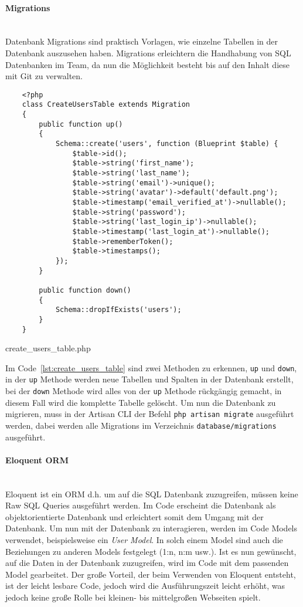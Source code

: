 \paragraph{Migrations}\mbox{}\\
Datenbank Migrations sind praktisch Vorlagen, wie einzelne Tabellen in der
Datenbank auszusehen haben. Migrations erleichtern die Handhabung von SQL
Datenbanken im Team, da nun die Möglichkeit besteht bis auf den Inhalt diese mit Git zu verwalten.

\begin{listing}[H]
  \begin{verbatim}
    <?php
    class CreateUsersTable extends Migration
    {
        public function up()
        {
            Schema::create('users', function (Blueprint $table) {
                $table->id();
                $table->string('first_name');
                $table->string('last_name');
                $table->string('email')->unique();
                $table->string('avatar')->default('default.png');
                $table->timestamp('email_verified_at')->nullable();
                $table->string('password');
                $table->string('last_login_ip')->nullable();
                $table->timestamp('last_login_at')->nullable();
                $table->rememberToken();
                $table->timestamps();
            });
        }
    
        public function down()
        {
            Schema::dropIfExists('users');
        }
    }
  \end{verbatim}
  \caption{create\_users\_table.php}
  \label{lst:create_users_table}
\end{listing}

Im Code~\ref{lst:create_users_table} sind zwei Methoden zu erkennen, \verb|up|
und \verb|down|, in der \verb|up| Methode werden neue Tabellen und Spalten in
der Datenbank erstellt, bei der \verb|down| Methode wird alles von der \verb|up|
Methode rückgängig gemacht, in diesem Fall wird die komplette Tabelle gelöscht.
Um nun die Datenbank zu migrieren, muss in der Artisan \acs*{CLI} der Befehl
\verb|php artisan migrate| ausgeführt werden, dabei werden alle Migrations im
Verzeichnis \verb|database/migrations| ausgeführt.

\paragraph{Eloquent ORM}\mbox{}\\
Eloquent ist ein \ac*{ORM} d.h. um auf die \acs*{SQL} Datenbank zuzugreifen,
müssen keine Raw \acs*{SQL} Queries ausgeführt werden. Im Code erscheint die
Datenbank als objektorientierte Datenbank und erleichtert somit dem Umgang mit
der Datenbank. Um nun mit der Datenbank zu interagieren, werden im Code Models
verwendet, beispielsweise ein \textit{User Model}. In solch einem Model sind auch die
Beziehungen zu anderen Models festgelegt (1:n, n:m usw.). Ist es nun gewünscht,
auf die Daten in der Datenbank zuzugreifen, wird im Code mit dem passenden Model
gearbeitet. Der große Vorteil, der beim Verwenden von Eloquent entsteht, ist der
leicht lesbare Code, jedoch wird die Ausführungszeit leicht erhöht, was jedoch
keine große Rolle bei kleinen- bis mittelgroßen Webseiten spielt.

